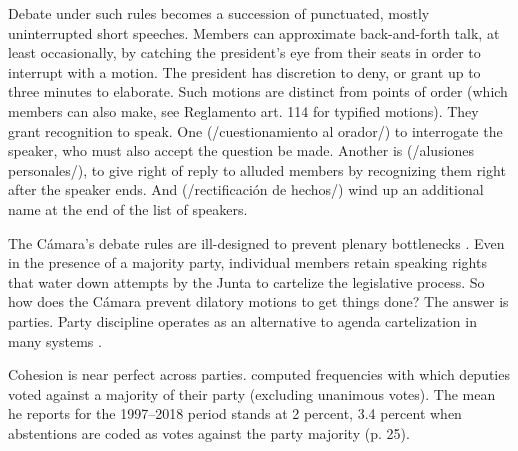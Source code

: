 \documentclass[letter,12pt]{article}
\begin{document}
Debate under such rules becomes a succession of punctuated, mostly uninterrupted short speeches. Members can approximate back-and-forth talk, at least occasionally, by catching the president's eye from their seats in order to interrupt with a motion. The president has discretion to deny, or grant up to three minutes to elaborate. Such motions are distinct from points of order (which members can also make, see Reglamento art. 114 for typified motions). They grant recognition to speak. One (/cuestionamiento al orador/) to interrogate the speaker, who must also accept the question be made. Another is (/alusiones personales/), to give right of reply to alluded members by recognizing them right after the speaker ends. And (/rectificación de hechos/) wind up an additional name at the end of the list of speakers. 

The Cámara's debate rules are ill-designed to prevent plenary bottlenecks \citep{cox.2006}. Even in the presence of a majority party, individual members retain speaking rights that water down attempts by the Junta to cartelize the legislative process. So how does the Cámara prevent dilatory motions to get things done? The answer is parties. Party discipline operates as an alternative to agenda cartelization in many systems \citep{prata.2006}. 

Cohesion is near perfect across parties. \citet{tellez-del-rio.2018} computed frequencies with which deputies voted against a majority of their party (excluding unanimous votes). The mean he reports for the 1997--2018 period stands at 2 percent, 3.4 percent when abstentions are coded as votes against the party majority (p. 25). 
\end{document}
